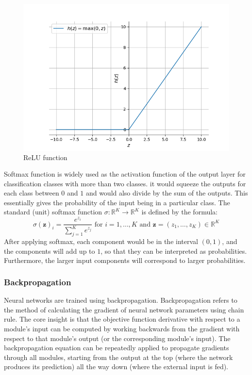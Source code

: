 \documentclass{beamer}
\begin{document}
\begin{frame}[allowframebreaks]
\begin{figure}[H]
\includegraphics[scale=0.5]{png/relu.png} 
\caption{ReLU function}
\label{fig:relu}
\end{figure}
Softmax function is widely used as the activation function of the output layer for classification classes with more than two classes. it would squeeze the outputs for each class between $0$ and $1$ and would also divide by the sum of the outputs. This essentially gives the probability of the input being in a particular class. The standard (unit) softmax function $\sigma :\mathbb{R}^{K}\to \mathbb{R}^{K}$ is defined by the formula:
\begin{equation}\label{eqn:softmax}
\sigma (\bm{z} )_{i}={\frac {e^{z_{i}}}{\sum _{j=1}^{K}e^{z_{j}}}}{\text{ for }}i=1,\dotsc ,K{\text{ and }}\bm{z} =(z_{1},\dotsc ,z_{K})\in \mathbb {R} ^{K}
\end{equation}
After applying softmax, each component would be in the interval $(0,1)$, and the components will add up to $1$, so that they can be interpreted as probabilities. Furthermore, the larger input components will correspond to larger probabilities.
\end{frame}

\begin{frame}
\frametitle{Backpropagation}
Neural networks are trained using backpropagation. Backpropagation refers to the method of calculating the gradient of neural network parameters using  chain rule. The core insight is that the objective function derivative with respect to a module's input can be computed by working backwards from the gradient with respect to that module's output (or the corresponding module's input). The backpropagation equation can be repeatedly applied to propagate gradients through all modules, starting from the output at the top (where the network produces its prediction) all the way down (where the external input is fed). 
\end{frame}
\end{document}
